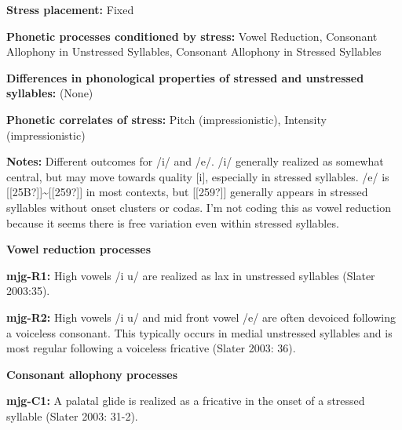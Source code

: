 \begin{styleBody}
\textbf{Stress placement:} Fixed
\end{styleBody}

\begin{styleBody}
\textbf{Phonetic processes conditioned by stress:} Vowel Reduction, Consonant Allophony in Unstressed Syllables, Consonant Allophony in Stressed Syllables
\end{styleBody}

\begin{styleBody}
\textbf{Differences in phonological properties of stressed and unstressed syllables:} (None)
\end{styleBody}

\begin{styleBody}
\textbf{Phonetic correlates of stress: }Pitch (impressionistic), Intensity (impressionistic)
\end{styleBody}

\begin{styleBody}
\textbf{Notes: }Different outcomes for /i/ and /e/. /i/ generally realized as somewhat central, but may move towards quality [i], especially in stressed syllables. /e/ is [[25B?]]\~{}[[259?]] in most contexts, but [[259?]] generally appears in stressed syllables without onset clusters or codas. I’m not coding this as vowel reduction because it seems there is free variation even within stressed syllables.
\end{styleBody}

\begin{styleBody}
\textbf{Vowel reduction processes}
\end{styleBody}

\begin{styleBody}
\textbf{mjg-R1:} High vowels /i u/ are realized as lax in unstressed syllables (Slater 2003:35).
\end{styleBody}

\begin{styleBody}
\textbf{mjg-R2:} High vowels /i u/ and mid front vowel /e/ are often devoiced following a voiceless consonant. This typically occurs in medial unstressed syllables and is most regular following a voiceless fricative (Slater 2003: 36).
\end{styleBody}

\begin{styleBody}
\textbf{Consonant allophony processes}
\end{styleBody}

\begin{styleBody}
\textbf{mjg-C1: }A palatal glide is realized as a fricative in the onset of a stressed syllable (Slater 2003: 31-2).
\end{styleBody}

